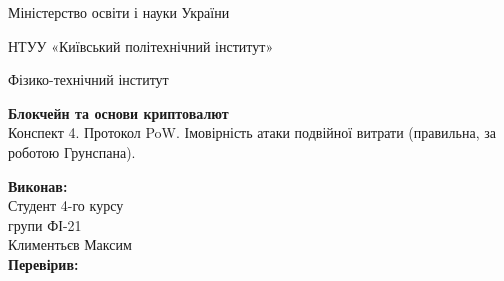 \documentclass{article}
\begin{document}
    \begin{titlepage}
        \begin{center}

        Міністерство освіти і науки України
        
        НТУУ «Київський політехнічний інститут»
        
        Фізико-технічний інститут
        \vspace{3.3cm}
        
        {\textbf{Блокчейн та основи криптовалют}\\Конспект 4. Протокол PoW. Імовірність атаки подвійної витрати (правильна, за роботою Грунспана).}

        \vspace{8.5cm}

        \begin{flushright}
            \textbf{Виконав:}\\Студент 4-го курсу\\групи ФІ-21\\Климентьєв Максим\\
            \textbf{Перевірив:}\\\text{\_\_\_\_\_\_\_\_\_\_\_\_\_\_\_\_\_\_}
        \end{flushright}

        \end{center}
    \end{titlepage}
    \newpage

    \tableofcontents
    \cleardoublepage
    \setcounter{page}{3}

    \newpage
\end{document}
